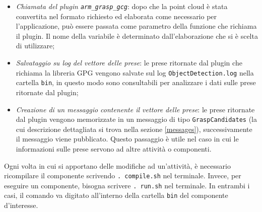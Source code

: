 \documentclass{report}
\begin{document}
\begin{itemize}
\item \textit{Chiamata del plugin \texttt{arm\_grasp\_gcg}}: dopo che la point cloud è stata convertita nel formato richiesto ed elaborata come necessario per l'applicazione, può essere passata come parametro della funzione che richiama il plugin. Il nome della variabile è determinato dall'elaborazione che si è scelta di utilizzare;
\item \textit{Salvataggio su log del vettore delle prese}: le prese ritornate dal plugin che richiama la libreria GPG vengono salvate sul log \texttt{ObjectDetection.log} nella cartella \texttt{bin}, in questo modo sono consultabili per analizzare i dati sulle prese ritornate dal plugin;
\item \textit{Creazione di un messaggio contenente il vettore delle prese}: le prese ritornate dal plugin vengono memorizzate in un messaggio di tipo \texttt{GraspCandidates} (la cui descrizione dettagliata si trova nella sezione \ref{messages}), successivamente il messaggio viene pubblicato. Questo passaggio è utile nel caso in cui le informazioni sulle prese servono ad altre attività o componenti.
\end{itemize}
Ogni volta in cui si apportano delle modifiche ad un'attività, è necessario ricompilare il componente scrivendo \texttt{.~compile.sh} nel terminale. Invece, per eseguire un componente, bisogna scrivere \texttt{.~run.sh} nel terminale. In entrambi i casi, il comando va digitato all'interno della cartella \texttt{bin} del componente d'interesse.
\end{document}
